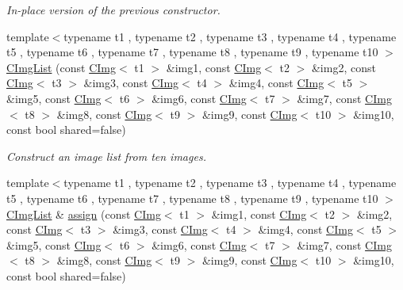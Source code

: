 \begin{DoxyCompactItemize}
\begin{DoxyCompactList}\small\item\em In-\/place version of the previous constructor. \item\end{DoxyCompactList}\item 
\hypertarget{structcimg__library_1_1_c_img_list_a5d483d8137f9b8d3ed079716d2322081}{
{\footnotesize template$<$typename t1 , typename t2 , typename t3 , typename t4 , typename t5 , typename t6 , typename t7 , typename t8 , typename t9 , typename t10 $>$ }\\\hyperlink{structcimg__library_1_1_c_img_list_a5d483d8137f9b8d3ed079716d2322081}{CImgList} (const \hyperlink{structcimg__library_1_1_c_img}{CImg}$<$ t1 $>$ \&img1, const \hyperlink{structcimg__library_1_1_c_img}{CImg}$<$ t2 $>$ \&img2, const \hyperlink{structcimg__library_1_1_c_img}{CImg}$<$ t3 $>$ \&img3, const \hyperlink{structcimg__library_1_1_c_img}{CImg}$<$ t4 $>$ \&img4, const \hyperlink{structcimg__library_1_1_c_img}{CImg}$<$ t5 $>$ \&img5, const \hyperlink{structcimg__library_1_1_c_img}{CImg}$<$ t6 $>$ \&img6, const \hyperlink{structcimg__library_1_1_c_img}{CImg}$<$ t7 $>$ \&img7, const \hyperlink{structcimg__library_1_1_c_img}{CImg}$<$ t8 $>$ \&img8, const \hyperlink{structcimg__library_1_1_c_img}{CImg}$<$ t9 $>$ \&img9, const \hyperlink{structcimg__library_1_1_c_img}{CImg}$<$ t10 $>$ \&img10, const bool shared=false)}
\label{structcimg__library_1_1_c_img_list_a5d483d8137f9b8d3ed079716d2322081}

\begin{DoxyCompactList}\small\item\em Construct an image list from ten images. \item\end{DoxyCompactList}\item 
\hypertarget{structcimg__library_1_1_c_img_list_ae3ebe1d33c59ac0b69bdc7edb3bc2a23}{
{\footnotesize template$<$typename t1 , typename t2 , typename t3 , typename t4 , typename t5 , typename t6 , typename t7 , typename t8 , typename t9 , typename t10 $>$ }\\\hyperlink{structcimg__library_1_1_c_img_list}{CImgList} \& \hyperlink{structcimg__library_1_1_c_img_list_ae3ebe1d33c59ac0b69bdc7edb3bc2a23}{assign} (const \hyperlink{structcimg__library_1_1_c_img}{CImg}$<$ t1 $>$ \&img1, const \hyperlink{structcimg__library_1_1_c_img}{CImg}$<$ t2 $>$ \&img2, const \hyperlink{structcimg__library_1_1_c_img}{CImg}$<$ t3 $>$ \&img3, const \hyperlink{structcimg__library_1_1_c_img}{CImg}$<$ t4 $>$ \&img4, const \hyperlink{structcimg__library_1_1_c_img}{CImg}$<$ t5 $>$ \&img5, const \hyperlink{structcimg__library_1_1_c_img}{CImg}$<$ t6 $>$ \&img6, const \hyperlink{structcimg__library_1_1_c_img}{CImg}$<$ t7 $>$ \&img7, const \hyperlink{structcimg__library_1_1_c_img}{CImg}$<$ t8 $>$ \&img8, const \hyperlink{structcimg__library_1_1_c_img}{CImg}$<$ t9 $>$ \&img9, const \hyperlink{structcimg__library_1_1_c_img}{CImg}$<$ t10 $>$ \&img10, const bool shared=false)}
\label{structcimg__library_1_1_c_img_list_ae3ebe1d33c59ac0b69bdc7edb3bc2a23}


\end{DoxyCompactItemize}

